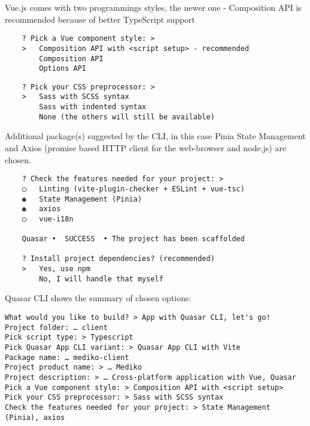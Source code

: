 Vue.js comes with two programmings styles, the newer one - Composition API is recommended because of better TypeScript support \autocite{VueAPIStyles}
\begin{verbatim}
    ? Pick a Vue component style: > 
    >   Composition API with <script setup> - recommended
        Composition API
        Options API

\end{verbatim}

\begin{verbatim}
    ? Pick your CSS preprocessor: > 
    >   Sass with SCSS syntax
        Sass with indented syntax
        None (the others will still be available)
\end{verbatim}

Additional package(s) suggested by the CLI, in this case Pinia State Management and Axios (promise based HTTP client for the web-browser and node.js) are chosen.
\begin{verbatim}
    ? Check the features needed for your project: >  
    ◯   Linting (vite-plugin-checker + ESLint + vue-tsc)
    ◉   State Management (Pinia)
    ◉   axios
    ◯   vue-i18n
    
    Quasar •  SUCCESS  • The project has been scaffolded

    ? Install project dependencies? (recommended)
    >   Yes, use npm
        No, I will handle that myself 

\end{verbatim}
    

Quasar CLI shows the summary of chosen options:

\begin{verbatim}
What would you like to build? > App with Quasar CLI, let's go!
Project folder: … client
Pick script type: > Typescript
Pick Quasar App CLI variant: > Quasar App CLI with Vite
Package name: … mediko-client
Project product name: > … Mediko
Project description: > … Cross-platform application with Vue, Quasar
Pick a Vue component style: > Composition API with <script setup>
Pick your CSS preprocessor: > Sass with SCSS syntax
Check the features needed for your project: > State Management (Pinia), axios
\end{verbatim}

\section{}%
\label{sec:webclient}

